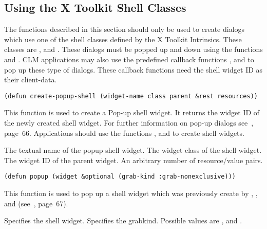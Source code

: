 \subsection{Using the X Toolkit Shell Classes}

The functions described in this section should only be used to create dialogs
which use one of the shell classes defined by the X Toolkit
Intrinsics.  These classes are ,  and
.  These dialogs must be popped up and down using the
functions  and .  CLM applications may also use the
predefined callback functions ,  and
 to pop up these type of dialogs.  These callback
functions need the shell widget ID as their client-data. 

\begin{lispd}
\syntax\begin{verbatim}
(defun create-popup-shell (widget-name class parent &rest resources))
\end{verbatim}
\beschr This function is used to create a Pop-up shell widget. It returns
the widget ID of the newly created shell widget.
For further information on pop-up dialogs see~\cite{xtoolkit}, page~66.
\hinweis Applications should use the functions ,
 and  to create
shell widgets.
\parameter
\begin{paramd}
 The textual name of the popup shell widget.
  The widget class of the shell widget.
 The widget ID of the parent widget.
 An arbitrary number of resource/value pairs.
\end{paramd}
\end{lispd}

\begin{lispd}
\syntax\begin{verbatim}
(defun popup (widget &optional (grab-kind :grab-nonexclusive)))
\end{verbatim}
\beschr This function is used  to pop up a shell widget which was previously
create by , ,
 and  
(see~\cite{xtoolkit}, page~67).
\parameter
\begin{paramd}
 Specifies the shell widget.
 Specifies the grabkind. Possible values are
,  and .
\end{paramd}
\end{lispd}

